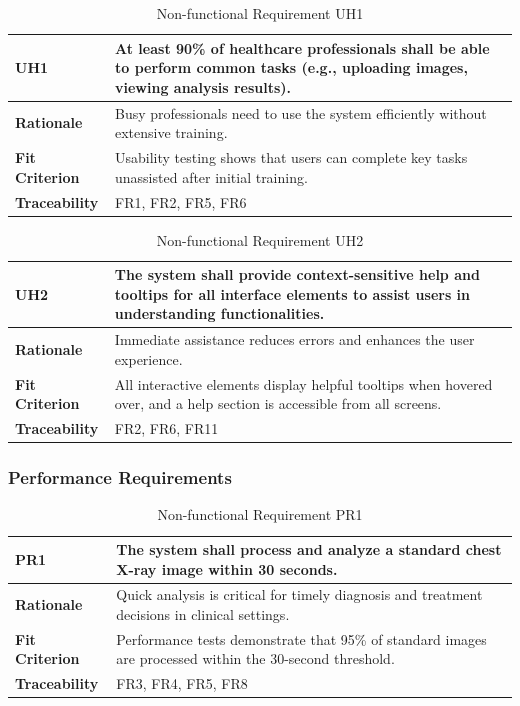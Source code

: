 \documentclass[12pt]{article}
\begin{document}
\begin{table}[h!]
\centering
{}
\begin{tabular}{|p{3.5cm}|p{11.5cm}|}
\hline
\rowcolor{gray!30}
\textbf{UH1} & At least 90\% of healthcare professionals shall be able to perform common tasks (e.g., uploading images, viewing analysis results). \\
\hline
\textbf{Rationale} & Busy professionals need to use the system efficiently without extensive training. \\
\hline
\textbf{Fit Criterion} & Usability testing shows that users can complete key tasks unassisted after initial training. \\
\hline
\textbf{Traceability} & FR1, FR2, FR5, FR6 \\
\hline
\end{tabular}
\caption{Non-functional Requirement UH1}
\end{table}

\begin{table}[h!]
\centering
{}
\begin{tabular}{|p{3.5cm}|p{11.5cm}|}
\hline
\rowcolor{gray!30}
\textbf{UH2} & The system shall provide context-sensitive help and tooltips for all interface elements to assist users in understanding functionalities. \\
\hline
\textbf{Rationale} & Immediate assistance reduces errors and enhances the user experience. \\
\hline
\textbf{Fit Criterion} & All interactive elements display helpful tooltips when hovered over, and a help section is accessible from all screens. \\
\hline
\textbf{Traceability} & FR2, FR6, FR11 \\
\hline
\end{tabular}
\caption{Non-functional Requirement UH2}
\end{table}
\newpage
\subsubsection{Performance Requirements}

\begin{table}[h!]
\centering
{}
\begin{tabular}{|p{3.5cm}|p{11.5cm}|}
\hline
\rowcolor{gray!30}
\textbf{PR1} & The system shall process and analyze a standard chest X-ray image within 30 seconds. \\
\hline
\textbf{Rationale} & Quick analysis is critical for timely diagnosis and treatment decisions in clinical settings. \\
\hline
\textbf{Fit Criterion} & Performance tests demonstrate that 95\% of standard images are processed within the 30-second threshold. \\
\hline
\textbf{Traceability} & FR3, FR4, FR5, FR8 \\
\hline
\end{tabular}
\caption{Non-functional Requirement PR1}
\end{table}
\end{document}
